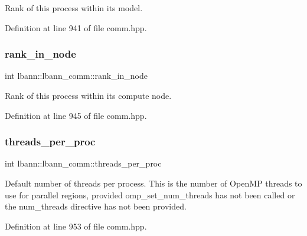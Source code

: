 Rank of this process within its model. 

Definition at line 941 of file comm.\+hpp.

\mbox{\label{classlbann_1_1lbann__comm_abb5c8b008b5cac11702bf1f991c78ab0}} 
\subsubsection{\texorpdfstring{rank\+\_\+in\+\_\+node}{rank\_in\_node}}
{\footnotesize\ttfamily int lbann\+::lbann\+\_\+comm\+::rank\+\_\+in\+\_\+node\hspace{0.3cm}{\ttfamily [private]}}

Rank of this process within its compute node. 

Definition at line 945 of file comm.\+hpp.

\mbox{\label{classlbann_1_1lbann__comm_a23ff8e3563e4472af29d15f6cb823bc1}} 
\subsubsection{\texorpdfstring{threads\+\_\+per\+\_\+proc}{threads\_per\_proc}}
{\footnotesize\ttfamily int lbann\+::lbann\+\_\+comm\+::threads\+\_\+per\+\_\+proc\hspace{0.3cm}{\ttfamily [private]}}

Default number of threads per process. This is the number of Open\+MP threads to use for parallel regions, provided omp\+\_\+set\+\_\+num\+\_\+threads has not been called or the num\+\_\+threads directive has not been provided. 

Definition at line 953 of file comm.\+hpp.

\mbox{\label{classlbann_1_1lbann__comm_a1fc59c935580eab2ce8e60464a45ef39}} 
